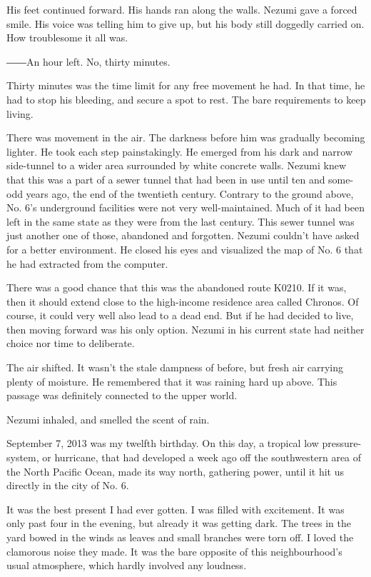 His feet continued forward. His hands ran along the walls. Nezumi gave a
forced smile. His voice was telling him to give up, but his body still
doggedly carried on. How troublesome it all was.

――An hour left. No, thirty minutes.

Thirty minutes was the time limit for any free movement he had. In that
time, he had to stop his bleeding, and secure a spot to rest. The bare
requirements to keep living.

There was movement in the air. The darkness before him was gradually
becoming lighter. He took each step painstakingly. He emerged from his
dark and narrow side-tunnel to a wider area surrounded by white concrete
walls. Nezumi knew that this was a part of a sewer tunnel that had been
in use until ten and some-odd years ago, the end of the twentieth
century. Contrary to the ground above, No. 6's underground facilities
were not very well-maintained. Much of it had been left in the same
state as they were from the last century. This sewer tunnel was just
another one of those, abandoned and forgotten. Nezumi couldn't have
asked for a better environment. He closed his eyes and visualized the
map of No. 6 that he had extracted from the computer.

There was a good chance that this was the abandoned route K0210. If it
was, then it should extend close to the high-income residence area
called Chronos. Of course, it could very well also lead to a dead end.
But if he had decided to live, then moving forward was his only option.
Nezumi in his current state had neither choice nor time to deliberate.

The air shifted. It wasn't the stale dampness of before, but fresh air
carrying plenty of moisture. He remembered that it was raining hard up
above. This passage was definitely connected to the upper world.

Nezumi inhaled, and smelled the scent of rain.

\mybreak

September 7, 2013 was my twelfth birthday. On this day, a tropical low
pressure-system, or hurricane, that had developed a week ago off the
southwestern area of the North Pacific Ocean, made its way north,
gathering power, until it hit us directly in the city of No. 6.

It was the best present I had ever gotten. I was filled with excitement.
It was only past four in the evening, but already it was getting dark.
The trees in the yard bowed in the winds as leaves and small branches
were torn off. I loved the clamorous noise they made. It was the bare
opposite of this neighbourhood's usual atmosphere, which hardly involved
any loudness.

